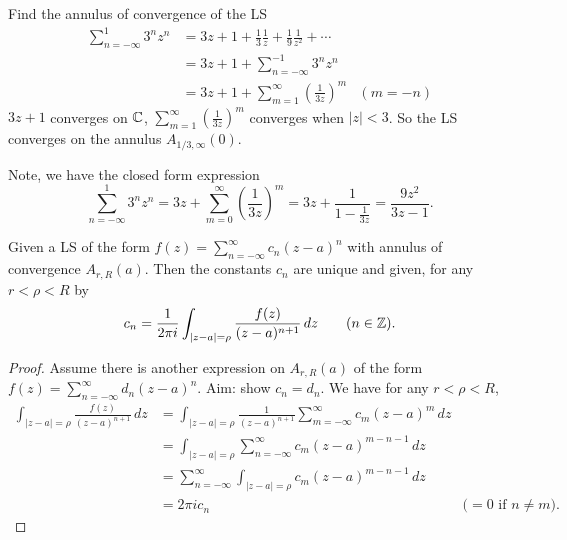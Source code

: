 \documentclass[10pt, a4paper]{article}
\begin{document}
\begin{example}
    Find the annulus of convergence of the LS
    \begin{align*}
        \sum_{n = -\infty}^{1}3 ^ nz ^ n &= 3z + 1 + \frac{1}{3}\frac{1}{z} + \frac{1}{9}\frac{1}{z ^ 2} + \dotsi \\
        &= 3z + 1 + \sum_{n = -\infty}^{-1}3 ^ nz ^ n \\
        &= 3z + 1 + \sum_{m = 1}^{\infty}\left(\frac{1}{3z}\right) ^ m &(m = -n)
    \end{align*}
    $3z + 1$ converges on $\mathbb{C}$,
    $\sum_{m = 1}^{\infty}\left(\frac{1}{3z}\right) ^ m$ converges when $|z| < 3$.
    So the LS converges on the annulus $A_{1 / 3, \infty}(0)$.
\end{example}

Note,
we have the closed form expression
\[
\sum_{n = -\infty}^{1}3 ^ nz ^ n = 3z + \sum_{m = 0}^{\infty}\left(\frac{1}{3z}\right) ^ m = 3z + \frac{1}{1 - \frac{1}{3z}} = \frac{9z ^ 2}{3z - 1}.
\]

\begin{proposition}
    Given a LS of the form $f(z) = \sum_{n = -\infty}^{\infty}c_n(z - a) ^ n$ with annulus of convergence $A_{r, R}(a)$.
    Then the constants $c_n$ are unique and given,
    for any $r < \rho < R$ by
    \[
    c_n = \frac{1}{2\pi i}\int_{|z - a| = \rho}\frac{f(z)}{(z - a) ^ {n + 1}}\,dz\qquad (n \in \mathbb{Z}).
    \]

    \begin{proof}
        Assume there is another expression on $A_{r, R}(a)$ of the form $f(z) = \sum_{n = -\infty}^{\infty}d_n(z - a) ^ n$.
        Aim:
        show $c_n = d_n$.
        We have for any $r < \rho < R$,
        \begin{align*}
            \int_{|z - a| = \rho}\frac{f(z)}{(z - a) ^ {n + 1}}\,dz &= \int_{|z - a| = \rho}\frac{1}{(z - a) ^ {n + 1}}\sum_{m = -\infty}^{\infty}c_m(z - a) ^ m\,dz \\
            &= \int_{|z - a| = \rho}\sum_{n = -\infty}^{\infty}c_m(z - a) ^ {m - n - 1}\,dz \\
            &= \sum_{n = -\infty}^{\infty}\int_{|z - a| = \rho}c_m(z - a) ^ {m - n - 1}\,dz \\
            &= 2\pi ic_n &(\text{$= 0$ if $n \neq m$)}.
        \end{align*}
    \end{proof}
\end{proposition}
\end{document}
